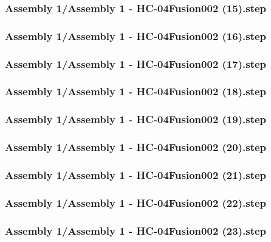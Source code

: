\documentclass[a4paper,12pt]{article}
\begin{document}
\subsubsection{Assembly 1/Assembly 1 - HC-04Fusion002 (15).step}

\subsubsection{Assembly 1/Assembly 1 - HC-04Fusion002 (16).step}

\subsubsection{Assembly 1/Assembly 1 - HC-04Fusion002 (17).step}

\subsubsection{Assembly 1/Assembly 1 - HC-04Fusion002 (18).step}

\subsubsection{Assembly 1/Assembly 1 - HC-04Fusion002 (19).step}

\subsubsection{Assembly 1/Assembly 1 - HC-04Fusion002 (20).step}

\subsubsection{Assembly 1/Assembly 1 - HC-04Fusion002 (21).step}

\subsubsection{Assembly 1/Assembly 1 - HC-04Fusion002 (22).step}

\subsubsection{Assembly 1/Assembly 1 - HC-04Fusion002 (23).step}

\end{document}
